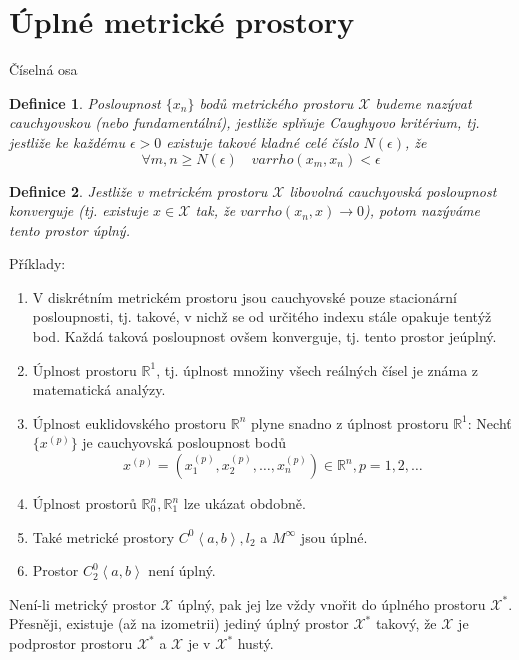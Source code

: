 \documentclass[a4paper, 11pt]{report}
\newtheorem{mydef}{Definice}[chapter]
\begin{document}
\section{Úplné metrické prostory}

Číselná osa

\begin{mydef}
Posloupnost $\{x_n\}$ bodů metrického prostoru $\mathcal{X}$ budeme nazývat \emph{cauchyovskou} (nebo \emph{fundamentální}), jestliže splňuje Caughyovo kritérium, tj. jestliže ke každému $\epsilon > 0$ existuje takové kladné celé číslo $N(\epsilon)$, že
$$ \forall m,n \geq N(\epsilon) \quad varrho(x_m, x_n) < \epsilon $$
\end{mydef}

\begin{mydef}
Jestliže v metrickém prostoru $\mathcal{X}$ libovolná cauchyovská posloupnost konverguje (tj. existuje $x \in \mathcal{X}$ tak, že $varrho(x_n, x) \to 0$), potom nazýváme tento prostor \emph{úplný}.
\end{mydef}

Příklady:
\begin{enumerate}
	\item V diskrétním metrickém prostoru jsou cauchyovské pouze stacionární posloupnosti, tj. takové, v nichž se od určitého indexu stále opakuje tentýž bod. Každá taková posloupnost ovšem konverguje, tj. tento prostor jeúplný.
	\item Úplnost prostoru $\mathbb{R}^1$, tj. úplnost množiny všech reálných čísel je známa z matematická analýzy.
	\item Úplnost euklidovského prostoru $\mathbb{R}^n$ plyne snadno z úplnost prostoru $\mathbb{R}^1$: Nechť $\{x^{(p)}\}$ je cauchyovská posloupnost bodů
	$$ x^{(p)} = (x^{(p)}_1, x^{(p)}_2, \dots, x^{(p)}_n) \in \mathbb{R}^n, p = 1, 2, \dots $$
	\item Úplnost prostorů $\mathbb{R}^n_0, \mathbb{R}^n_1$ lze ukázat obdobně.
	\item Také metrické prostory $C^0 \left<a, b \right>, l_2$ a $M^\infty$ jsou úplné.
	\item Prostor $C_2^0 \left<a, b \right>$ není úplný.
\end{enumerate}

Není-li metrický prostor $\mathcal{X}$ úplný, pak jej lze vždy vnořit do úplného prostoru $\mathcal{X}^*$. Přesněji, existuje (až na izometrii) jediný úplný prostor $\mathcal{X}^*$ takový, že $\mathcal{X}$ je podprostor prostoru $\mathcal{X}^*$ a $\mathcal{X}$ je v $\mathcal{X}^*$ hustý.
\end{document}

